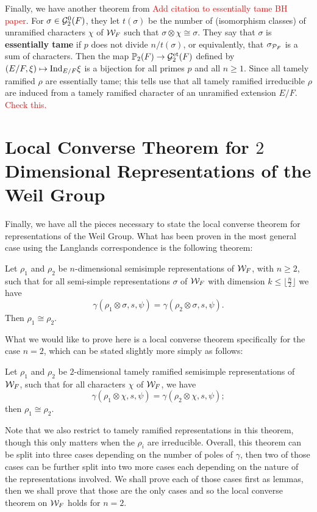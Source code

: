 Finally, we have another theorem from \textcolor{red}{Add citation to essentially tame BH paper}.
For $\sigma \in \mathcal{G}_2^0(F)$, they let $t(\sigma)$ be the number of (isomorphism classes) of unramified characters $\chi$ of $\cW_F$ such that $\sigma \otimes \chi \cong \sigma$.
They say that $\sigma$ is \textbf{essentially tame} if $p$ does not divide $n / t(\sigma)$, or equivalently, that $\sigma_{\mathcal{P}_F}$ is a sum of characters.
Then the map $\mathbb{P}_2(F) \to \mathcal{G}_2^{\textrm{et}}(F)$ defined by $(E/F, \xi) \mapsto \textrm{Ind}_{E/F} \xi$ is a bijection for all primes $p$ and all $n \geq 1$.
Since all tamely ramified $\rho$ are essentially tame; this tells use that all tamely ramified irreducible $\rho$ are induced from a tamely ramified character of an unramified extension $E/F$.
\textcolor{red}{Check this.}

\section{Local Converse Theorem for $2$ Dimensional Representations of the Weil Group}
\label{sec:n=2-LCT-weil-group}
Finally, we have all the pieces necessary to state the local converse theorem for representations of the Weil Group.
What has been proven in the most general case using the Langlands correspondence is the following theorem:

\begin{theorem}
  Let $\rho_1$ and $\rho_2$ be $n$-dimensional semisimple representations of $\cW_F$, with $n \geq 2$, such that for all semi-simple representations $\sigma$ of $\cW_F$ with dimension $k \leq \lfloor \frac{n}{2} \rfloor$ we have
  \[\gamma(\rho_1 \otimes \sigma,s,\psi) = \gamma(\rho_2 \otimes \sigma,s,\psi).\]
  Then $\rho_1 \cong \rho_2$.
\end{theorem}


What we would like to prove here is a local converse theorem specifically for the case $n=2$, which can be stated slightly more simply as follows:

\begin{theorem}[Local Converse Theorem on $\cW_F$ with $n=2$]
  \label{thm:LCTn=2}
  Let $\rho_1$ and $\rho_2$ be $2$-dimensional tamely ramified semisimple representations of $\cW_F$, such that for all characters $\chi$ of $\cW_F$, we have
  \[\gamma(\rho_1 \otimes \chi,s,\psi) = \gamma(\rho_2 \otimes \chi,s,\psi);\]
  then $\rho_1 \cong \rho_2$.
\end{theorem}

Note that we also restrict to tamely ramified representations in this theorem, though this only matters when the $\rho_i$ are irreducible.
Overall, this theorem can be split into three cases depending on the number of poles of $\gamma$, then two of those cases can be further split into two more cases each depending on the nature of the representations involved.
We shall prove each of those cases first as lemmas, then we shall prove that those are the only cases and so the local converse theorem on $\cW_F$ holds for $n=2$.

